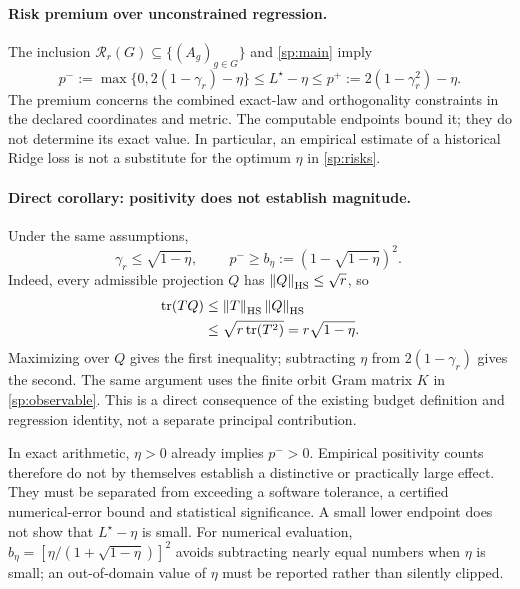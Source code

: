 \paragraph{Risk premium over unconstrained regression.}
\label{sp:risk-premium}
The inclusion $\mathcal R_r(G)\subseteq\{(A_g)_{g\in G}\}$ and \cref{sp:main} imply
\[
 p^-:=\max\{0,2(1-\gamma_r)-\eta\}
 \le L^\star-\eta
 \le p^+:=2(1-\gamma_r^2)-\eta.
\]
The premium concerns the combined exact-law and orthogonality constraints in the declared coordinates and metric. The computable endpoints bound it; they do not determine its exact value. In particular, an empirical estimate of a historical Ridge loss is not a substitute for the optimum $\eta$ in \cref{sp:risks}.

\paragraph{Direct corollary: positivity does not establish magnitude.}
Under the same assumptions,
\begin{equation}
 \gamma_r\le\sqrt{1-\eta},\qquad
 \boxed{\ p^-\ge b_\eta:=(1-\sqrt{1-\eta})^2.\ }
 \label{sp:premium-positivity}
\end{equation}
Indeed, every admissible projection $Q$ has $\left\lVert Q\right\rVert_{\mathrm{HS}}\le\sqrt r$, so
\[
 \begin{aligned}
 \operatorname{tr}(TQ)
 &\le
 \left\lVert T\right\rVert_{\mathrm{HS}}\left\lVert Q\right\rVert_{\mathrm{HS}}
 \\
 &\le
 \sqrt{r\operatorname{tr}(T^2)}
 =
 r\sqrt{1-\eta}.
 \end{aligned}
\]
Maximizing over $Q$ gives the first inequality; subtracting $\eta$ from $2(1-\gamma_r)$ gives the second. The same argument uses the finite orbit Gram matrix $K$ in \cref{sp:observable}. This is a direct consequence of the existing budget definition and regression identity, not a separate principal contribution.

In exact arithmetic, $\eta>0$ already implies $p^->0$. Empirical positivity counts therefore do not by themselves establish a distinctive or practically large effect. They must be separated from exceeding a software tolerance, a certified numerical-error bound and statistical significance. A small lower endpoint does not show that $L^\star-\eta$ is small. For numerical evaluation, $b_\eta=[\eta/(1+\sqrt{1-\eta})]^2$ avoids subtracting nearly equal numbers when $\eta$ is small; an out-of-domain value of $\eta$ must be reported rather than silently clipped.

